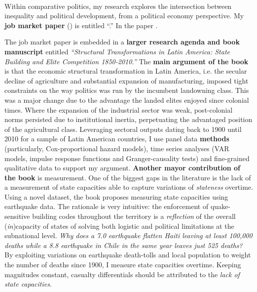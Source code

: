 \documentclass[10pt,stdletter,dateno,sigleft]{newlfm} %
\begin{document}
\begin{newlfm}




\vspace{-2cm}{\bf \huge Research Statement}\\

Within comparative politics, my research explores the intersection between inequality and political development, from a political economy perspective. My {\bf job market paper} (\emph{\unskip}) is entitled ``\href{https://github.com/hbahamonde/Earthquake_Paper/raw/master/Bahamonde_Earthquake_Paper.pdf}{\unskip}.'' In the paper \unskip.



The job market paper is embedded in a {\bf larger research agenda and book manuscript} entitled \emph{``Structural Transformations in Latin America: State Building and Elite Competition 1850-2010.''} The {\bf main argument of the book} is that the economic structural transformation in Latin America, i.e. the secular decline of agriculture and substantial expansion of manufacturing, imposed tight constraints on the way politics was run by the incumbent landowning class. This was a major change due to the advantage the landed elites enjoyed since colonial times. Where the expansion of the industrial sector was weak, post-colonial norms persisted due to institutional inertia, perpetuating the advantaged position of the agricultural class. Leveraging sectoral outputs dating back to 1900 until 2010 for a sample of Latin American countries, I use panel data {\bf methods} (particularly, Cox-proportional hazard models), time series analyses (VAR models, impulse response functions and Granger-causality tests) and fine-grained qualitative data to support my argument. {\bf Another mayor contribution of the book} is measurement. One of the biggest gaps in the literature is the lack of a measurement of state capacities able to capture variations of \emph{stateness} overtime. Using a novel dataset, the book proposes measuring state capacities using earthquake data. The rationale is very intuitive: the enforcement of quake-sensitive building codes throughout the territory is a \emph{reflection} of the overall (\emph{in})capacity of states of solving both logistic and political limitations at the subnational level. \emph{Why does a 7.0 earthquake flatten Haiti leaving at least 100,000 deaths while a 8.8 earthquake in Chile in the same year leaves just 525 deaths?} By exploiting  variations on earthquake death-tolls and local population to weight the number of deaths since 1900, I measure state capacities overtime. Keeping magnitudes constant, casualty differentials should be attributed to the \emph{lack of state capacities}.



\end{newlfm}
\end{document}
